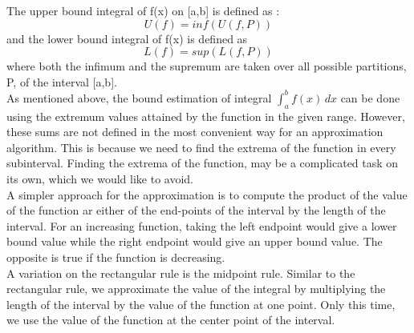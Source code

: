 \documentclass[11pt]{article}
\begin{document}
The upper bound integral of f(x) on [a,b] is defined as :
\[ U(f)= inf(U(f,P))\]
and the lower bound integral of f(x) is defined as
\[ L(f)= sup(L(f,P))\] where both the infimum and the supremum are taken over all possible partitions, P, of the interval [a,b]. \\

As mentioned above, the bound estimation of integral $\int_{a}^{b}f(x) \,dx$ can be done using the extremum values attained by the function in the given range. However, these sums are not defined in the most convenient way for an approximation algorithm. This is because we need to find the extrema of the function in every subinterval. Finding the extrema of the function, may be a complicated task on its own, which we would like to avoid.\\

A simpler approach for the approximation is to compute the product of the value of the function ar either of the end-points of the interval by the length of the interval. For an increasing function, taking the left endpoint would give a lower bound value while the right endpoint would give an upper bound value. The opposite is true if the function is decreasing.\\

A variation on the rectangular rule is the midpoint rule. Similar to the rectangular rule, we approximate the value of the integral by multiplying the length of the interval by the value of the function at one point. Only this time, we use the value of the function at the center point of the interval.\\
\end{document}
